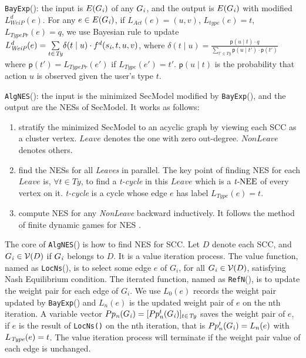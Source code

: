 \documentclass[10pt, conference, compsocconf]{IEEEtran}
\begin{document}
\verb"BayExp"():
the input is $E(G_{\it i})$ of any $G_{\it i}$, and the output is $E(G_{\it i})$ with modified $L_{\textit{WeiP}}^d(e)$.
For any $e\in E(G_{\it i})$, if $L_{\textit{Act}}(e)=(u,v)$, $L_{\textit{type}}(e)=t$, $L_{\textit{TypePr}}(e)=q$, we use Bayesian rule to update $L_{\textit{WeiP}}^d(e)=\underset{t\in {\it Ty}}{\sum}\delta(t\mid u)\cdot f^d(s_{\textit{i}},t,u,v)$, where
$\delta(t\mid u)=\frac{\mathsf{p}(u\mid t)\cdot q} {\underset{t'\in \textit{Ty}}{\sum}\mathsf{p}(u\mid t')\cdot \mathsf{p}(t')}$
where $\mathsf{p}(t')=L_{\textit{TypePr}}(e')$ if  $L_{\textit{Type}}(e')=t'$. $\mathsf{p}(u\mid t)$ is the probability that action $u$ is observed given the user's type $t$.

\verb"AlgNES"():
the input is the minimized SecModel modified by \verb"BayExp"(), and the output are the NESs of SecModel. It works as follows:
\begin{enumerate}[1]
\item stratify the minimized SecModel to an acyclic graph by viewing each SCC as a cluster vertex. $\textit{Leave}$ denotes the one with zero out-degree. $\textit{NonLeave}$ denotes others.
\item find the NESs for all \textit{Leaves} in parallel. The key point of finding NES for each $\textit{Leave}$ is, $\forall t\in \textit{Ty}$, to find a \textit{t-cycle} in this $\textit{Leave}$ which is a $\textit{t-{\rm NEE}}$ of every vertex on it. \textit{t-cycle} is a cycle whose edge $e$ has label $L_{\textit{Type}}(e)=t$.
\item compute NES for any \textit{NonLeave} backward inductively. It follows the method of finite dynamic games for NES \cite{martin}.
\end{enumerate}

The core of \verb"AlgNES"() is how to find NES for SCC. Let $D$ denote each SCC, and $G_{\it i}\in \mathcal{V}(D)$ if $G_{\it i}$ belongs to $D$. It is a value iteration process.
The value function, named as \verb"LocNs"(), is to select some edge $e$ of $G_{\textit{i}}$, for all $G_{\it i}\in \mathcal{V}(D)$, satisfying Nash Equilibrium condition.
The iterated function, named as \verb"RefN"(), is to update the weight pair for each edge of $G_{\textit{i}}$.
We use $L_0(e)$ records the weight pair updated by \verb"BayExp"() and $L_{n}(e)$ is the updated weight pair of $e$ on the nth iteration. A variable vector $Pp_{\it n}(G_{\it i})=[Pp_{\it n}^t(G_{\it i})]_{t \in \textit{Ty}}$ saves the weight pair of $e$, if $e$ is the result of \verb"LocNs()" on the nth iteration, that is $Pp_{\it n}^t(G_{\it i})=L_n(e)$ with $L_{\it Type}(e)=t$.
The value iteration process will terminate if the weight pair value of each edge is unchanged.
\end{document}
